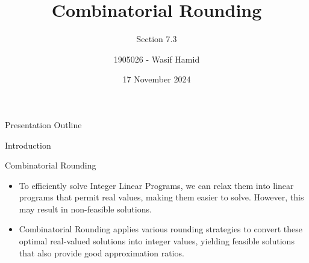 \documentclass[xcolor=svgnames]{beamer}
\title[Combinatorial Rounding] 
{Combinatorial Rounding}
\subtitle{Section 7.3}
\author[Wasif Hamid] %
{1905026 - Wasif Hamid }
\institute[CSE, BUET] %
{
  Department of Computer Science and Engineering\\
  Bangladesh University of Engineering and Technology
}
\date[17 Nov 2024] %
{17 November 2024}
\begin{document}
\frame{\titlepage}

\begin{frame}{Presentation Outline}
    \tableofcontents
\end{frame}
\begin{section}{Introduction}
    \begin{frame}{Combinatorial Rounding}
        \begin{itemize}[<+->]
            \item To efficiently solve Integer Linear Programs, we can relax them into linear programs that permit real values, making them easier to solve. However, this may result in non-feasible solutions. 
            \item Combinatorial Rounding applies various rounding strategies to convert these optimal real-valued solutions into integer values, yielding feasible solutions that also provide good approximation ratios.
        \end{itemize}
    \end{frame} 
\end{section}
\end{document}

